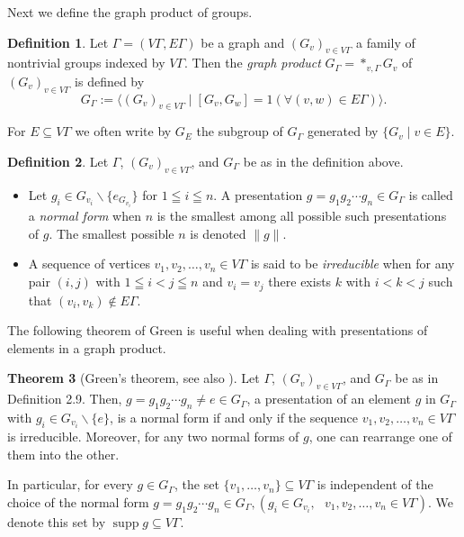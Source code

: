 \documentclass{amsart}
\theoremstyle{definition}
\newtheorem{theorem}{Theorem}[section]
\newtheorem{definition}[theorem]{Definition}
\renewcommand{\subset}{\subseteq}
\begin{document}
Next we define the graph product of groups. 

\begin{definition}
Let $\Gamma = (V\Gamma, E\Gamma)$ be a graph and $(G_v)_{v\in V\Gamma}$ a family of nontrivial groups indexed by $V\Gamma$. Then the \emph{graph product} $G_{\Gamma}=\ast_{v,\Gamma} G_v$ of $(G_v)_{v\in V\Gamma}$ is defined by
\[
G_{\Gamma} := \langle (G_v)_{v\in V\Gamma} \mid [G_v, G_w]= 1 (\forall (v,w)\in E\Gamma) \rangle. 
\] 
\end{definition}

For $E\subset V\Gamma$ we often write by $G_E$ the subgroup of $G_{\Gamma}$ generated by $\{ G_v\mid v\in E\}$. 

\begin{definition}
Let $\Gamma$, $(G_v)_{v\in V\Gamma}$, and $G_{\Gamma}$ be as in the definition above.
\begin{itemize}
\item Let $g_i\in G_{v_i}\backslash  \{e_{G_{v_i}}\}$ for $1\leqq i\leqq n$. A presentation $g=g_1g_2\cdots g_n\in G_{\Gamma}$ is called a \emph{normal form} when $n$ is the smallest among all possible such presentations of $g$. The smallest possible $n$ is denoted $\| g\|$. 
\item A sequence of vertices $v_1, v_2, \ldots, v_n\in V\Gamma$ is said to be \emph{irreducible} when for any pair $(i,j)$ with $1\leqq i<j\leqq n$ and $v_i=v_j$ there exists $k$ with $i<k<j$ such that $(v_i, v_k)\notin E\Gamma$. 
\end{itemize}
\end{definition}

The following theorem of Green \cite{gre} is useful when dealing with presentations of elements in a graph product. 

\begin{theorem}[Green's theorem, see also \textup{\cite[Theorem 2.14]{oya1}}]

Let $\Gamma$, $(G_v)_{v\in V\Gamma}$, and $G_{\Gamma}$ be as in Definition 2.9. Then, $g=g_1g_2\cdots g_n\neq e\in G_{\Gamma}$, a presentation of an element $g$ in $G_{\Gamma}$ with $g_i\in G_{v_i}\backslash \{ e \}$, is a normal form if and only if the sequence $v_1, v_2, \ldots, v_n\in V\Gamma$ is irreducible. Moreover, for any two normal forms of $g$, one can rearrange one of them into the other. 
\end{theorem}

In particular, for every $g\in G_{\Gamma}$, the set $\{ v_1, \ldots , v_n\}\subset V\Gamma$ is independent of the choice of the normal form $g=g_1g_2\cdots g_n\in G_{\Gamma}, (g_i\in G_{v_i}, \text{ } v_1, v_2, \ldots, v_n\in V\Gamma)$. We denote this set by $\mathop{supp} g\subset V\Gamma$. 
\end{document}
